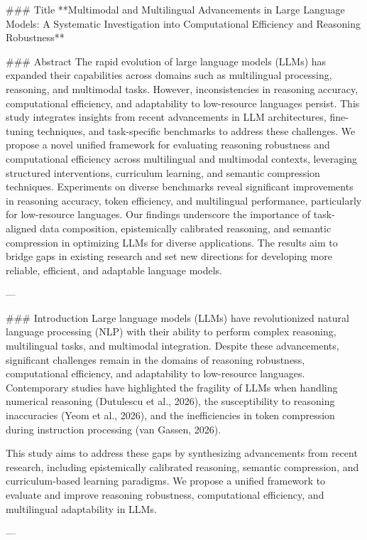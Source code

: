 ### Title
**Multimodal and Multilingual Advancements in Large Language Models: A Systematic Investigation into Computational Efficiency and Reasoning Robustness**

### Abstract
The rapid evolution of large language models (LLMs) has expanded their capabilities across domains such as multilingual processing, reasoning, and multimodal tasks. However, inconsistencies in reasoning accuracy, computational efficiency, and adaptability to low-resource languages persist. This study integrates insights from recent advancements in LLM architectures, fine-tuning techniques, and task-specific benchmarks to address these challenges. We propose a novel unified framework for evaluating reasoning robustness and computational efficiency across multilingual and multimodal contexts, leveraging structured interventions, curriculum learning, and semantic compression techniques. Experiments on diverse benchmarks reveal significant improvements in reasoning accuracy, token efficiency, and multilingual performance, particularly for low-resource languages. Our findings underscore the importance of task-aligned data composition, epistemically calibrated reasoning, and semantic compression in optimizing LLMs for diverse applications. The results aim to bridge gaps in existing research and set new directions for developing more reliable, efficient, and adaptable language models.

---

### Introduction
Large language models (LLMs) have revolutionized natural language processing (NLP) with their ability to perform complex reasoning, multilingual tasks, and multimodal integration. Despite these advancements, significant challenges remain in the domains of reasoning robustness, computational efficiency, and adaptability to low-resource languages. Contemporary studies have highlighted the fragility of LLMs when handling numerical reasoning (Dutulescu et al., 2026), the susceptibility to reasoning inaccuracies (Yeom et al., 2026), and the inefficiencies in token compression during instruction processing (van Gassen, 2026).

This study aims to address these gaps by synthesizing advancements from recent research, including epistemically calibrated reasoning, semantic compression, and curriculum-based learning paradigms. We propose a unified framework to evaluate and improve reasoning robustness, computational efficiency, and multilingual adaptability in LLMs.

---


